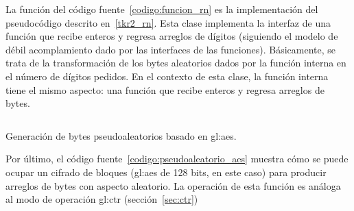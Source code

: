 La función del código fuente~\ref{codigo:funcion_rn} es la implementación del
pseudocódigo descrito en~\ref{tkr2_rn}. Esta clase implementa la
interfaz de una función que recibe enteros y regresa arreglos de dígitos
(siguiendo el modelo de débil acomplamiento dado por las interfaces de
las funciones). Básicamente, se trata de la transformación de
los bytes aleatorios dados por la función interna en el número de
dígitos pedidos. En el contexto de esta clase, la función interna tiene
el mismo aspecto: una función que recibe enteros y regresa arreglos de bytes.

\begin{listing}
  \inputminted[firstline=51, lastline=82]
    {c++}{../implementaciones/tkr/pseudoaleatorio_aes.cpp}
  \caption{Generación de bytes pseudoaleatorios basado en \acrshort{gl:aes}.}
  \label{codigo:pseudoaleatorio_aes}
\end{listing}

Por último, el código fuente~\ref{codigo:pseudoaleatorio_aes} muestra
cómo se puede ocupar un cifrado de bloques (\gls{gl:aes} de 128 bits, en
este caso) para producir arreglos de bytes con aspecto aleatorio. La
operación de esta función es análoga al modo de operación \gls{gl:ctr}
(sección~\ref{sec:ctr})

